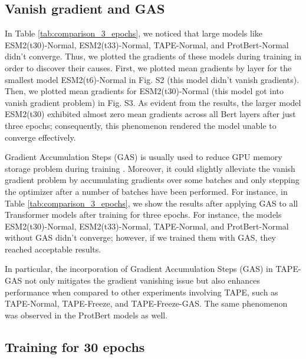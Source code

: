 




\subsection{Vanish gradient and GAS}

In Table \ref{tab:comparison_3_epochs}, we noticed that large models like ESM2(t30)-Normal, ESM2(t33)-Normal, TAPE-Normal, and ProtBert-Normal didn't converge. Thus, we plotted the gradients of these models during training in order to discover their causes. First, we plotted mean gradients by layer for the smallest model ESM2(t6)-Normal in Fig. S2 (this model didn't vanish gradients). Then, we plotted mean gradients for ESM2(t30)-Normal (this model got into vanish gradient problem) in Fig. S3. As evident from the results, the larger model ESM2(t30) exhibited almost zero mean gradients across all Bert layers after just three epochs; consequently, this phenomenon rendered the model unable to converge effectively.


Gradient Accumulation Steps (GAS) is usually used to reduce GPU memory storage problem during training \cite{zhang2023adam,huang2023measuring}. Moreover, it could slightly alleviate the vanish gradient problem by accumulating gradients over some batches and only stepping the optimizer after a number of batches have been performed. For instance, in Table \ref{tab:comparison_3_epochs}, we show the results after applying GAS to all Transformer models after training for three epochs. For instance, the models ESM2(t30)-Normal, ESM2(t33)-Normal, TAPE-Normal, and ProtBert-Normal without GAS didn't converge; however, if we trained them with GAS, they reached acceptable results. 



In particular, the incorporation of Gradient Accumulation Steps (GAS) in TAPE-GAS not only mitigates the gradient vanishing issue but also enhances performance when compared to other experiments involving TAPE, such as TAPE-Normal, TAPE-Freeze, and TAPE-Freeze-GAS. The same phenomenon was observed in the ProtBert models as well.





\subsection{Training for 30 epochs}

